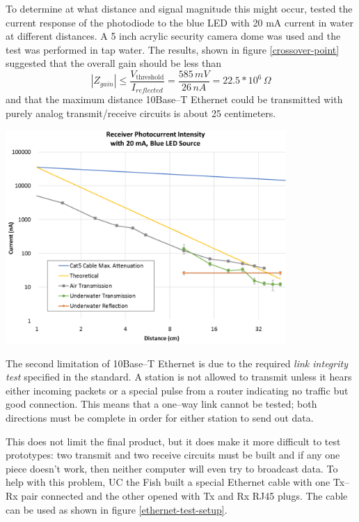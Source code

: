 ﻿\documentclass{article}
\begin{document}
To determine at what distance and signal magnitude this might occur,
tested the current response of the photodiode to the blue LED with 20 mA current
in water at different distances.
A 5 inch acrylic security camera dome was used and the test was performed in
tap water.
The results, shown in figure \ref{crossover-point} suggested that the overall gain
should be less than
\begin{equation}
|Z_{gain}| \leq \frac{V_{\textrm{threshold}}}{I_{reflected}}=\frac{585\,mV}{26\,nA}=22.5*10^{6}\,\Omega
\end{equation}
and that the maximum distance 10Base--T Ethernet could be transmitted with purely analog transmit/receive
circuits is about 25 centimeters.

\begin{center}
	\includegraphics[width=0.8\textwidth]{crossover-point.pdf}
	\label{crossover-point}
\end{center}

The second limitation of 10Base--T Ethernet is due to the required \textit{link integrity test}
specified in the standard.
A station is not allowed to transmit unless it hears either incoming packets or
a special pulse from a router indicating no traffic but good connection.
This means that a one--way link cannot be tested; both directions must be complete
in order for either station to send out data.

This does not limit the final product, but it does make it more difficult to test
prototypes: two transmit and two receive circuits must be built and if
any one piece doesn't work, then neither computer will even try to broadcast data.
To help with this problem, UC the Fish built a special Ethernet cable with
one Tx--Rx pair connected and the other opened with Tx and Rx RJ45 plugs.
The cable can be used as shown in figure \ref{ethernet-test-setup}.
\end{document}
